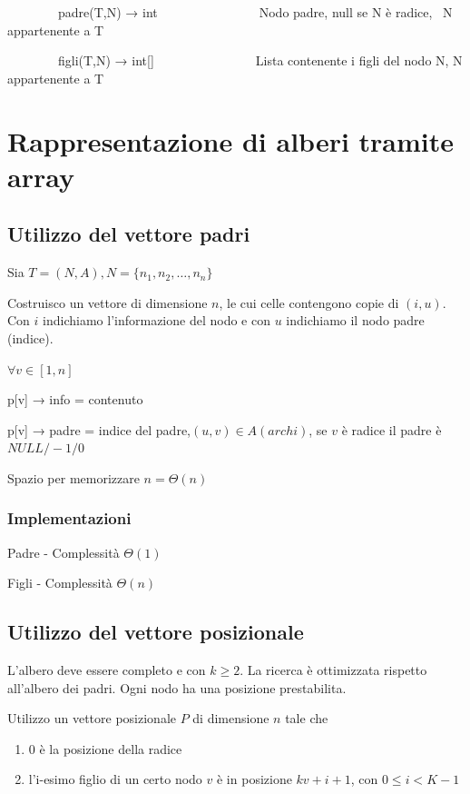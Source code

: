 \documentclass[11pt,a4paper,twoside,openright]{book}
\providecommand{\tightlist}{\setlength{\itemsep}{0pt}\setlength{\parskip}{0pt}}
\begin{document}
{{{~~~~~~~~padre(T,N) → int~~~~~~~~~~~~~~~~Nodo padre, null se N è radice,
~N appartenente a T}

{~~~~~~~~figli(T,N) → int{[}{]}~~~~~~~~~~~~~~~~Lista contenente i figli
del nodo N, N appartenente a T}

{}

\section{Rappresentazione di alberi tramite array}

\subsection{Utilizzo del vettore padri}

{Sia $T=(N,A), N = \{n_1,n_2,\ldots,n_n\}$}

{Costruisco un vettore di dimensione $n$, le cui celle contengono copie di $(i,u)$. Con $i$ indichiamo l'informazione del nodo e con $u$ indichiamo il nodo padre (indice).}

$\forall v \in [1,n]$

{p{[}v{]} → info = contenuto}

{p{[}v{]} → padre = indice del padre,$(u,v) \in A(archi)$, se $v$ è radice il padre è $NULL/-1/0$}

{Spazio per memorizzare $n=\Theta(n)$}

\subsubsection{Implementazioni}

{Padre - Complessità $\Theta(1)$}



{Figli - Complessità $\Theta(n)$}



\subsection{Utilizzo del vettore posizionale}

{L'albero deve essere completo e con $k \geq 2$. La ricerca è ottimizzata rispetto all'albero dei padri. Ogni nodo ha una posizione prestabilita.}

{Utilizzo un vettore posizionale $P$ di dimensione $n$ tale che }

\begin{enumerate}
\tightlist
\item
  {0 è la posizione della radice}
\item
  {l'i-esimo figlio di un certo nodo $v$ è in posizione $kv+i+1$, con $0\leq i < K-1$}
\end{enumerate}

}}
\end{document}
